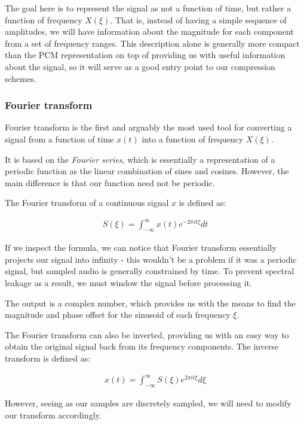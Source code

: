 The goal here is to represent the signal as not a function of time, but rather a function of frequency $X(\xi)$. That is, instead of having a simple sequence of amplitudes, we will have information about the magnitude for each component from a set of frequency ranges. This description alone is generally more compact than the PCM representation \cite{bosi_goldberg_2003} on top of providing us with useful information about the signal, so it will serve as a good entry point to our compression schemes.

\subsubsection{Fourier transform}
Fourier transform is the first and arguably the most used tool for converting a signal from a function of time $x(t)$ into a function of frequency $X(\xi)$.

It is based on the \emph{Fourier series}, which is essentially a representation of a periodic function as the linear combination of sines and cosines. \cite{Shatkay:1995:FTP:864947} However, the main difference is that our function need not be periodic.

The Fourier transform of a continuous signal $x$ is defined as: \cite{recoskie_mann_2014}

\begin{align}
S(\xi) = \int_{-\infty}^{\infty}x(t)e^{-2\pi it\xi}dt
\end{align}

If we inspect the formula, we can notice that Fourier transform essentially projects our signal into infinity - this wouldn't be a problem if it was a periodic signal, but sampled audio is generally constrained by time. To prevent spectral leakage as a result, we must window the signal before processing it. \cite{heinzel_2002_windows}

The output is a complex number, which provides us with the means to find the magnitude and phase offset for the sinusoid of each frequency $\xi$.

The Fourier transform can also be inverted, providing us with an easy way to obtain the original signal back from its frequency components. The inverse transform is defined as:

\begin{align}
x(t) = \int_{-\infty}^{\infty}S(\xi)e^{2\pi it\xi}d\xi
\end{align}

However, seeing as our samples are discretely sampled, we will need to modify our transform accordingly.

